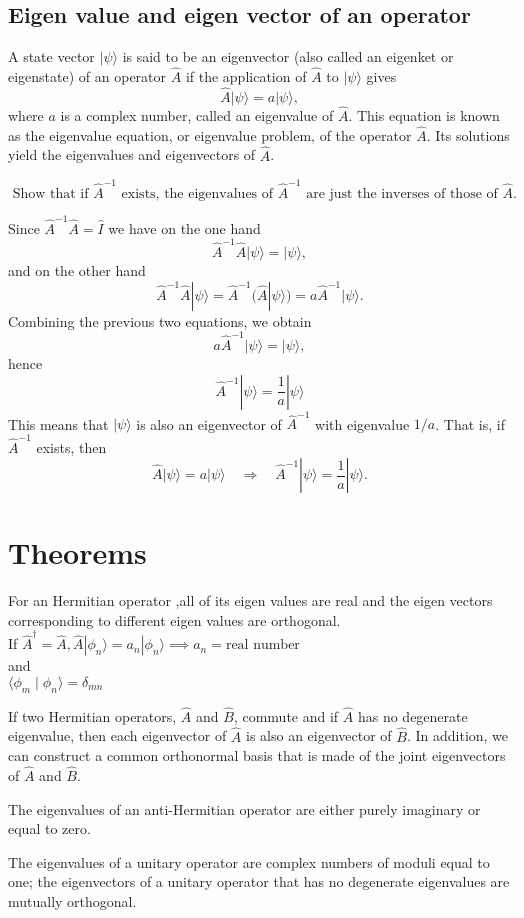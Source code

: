 \subsection{Eigen value and eigen vector of an operator}
A state vector $|\psi\rangle$ is said to be an eigenvector (also called an eigenket or eigenstate) of an operator $\hat{A}$ if the application of $\hat{A}$ to $|\psi\rangle$ gives
$$
\hat{A}|\psi\rangle=a|\psi\rangle,
$$
where $a$ is a complex number, called an eigenvalue of $\hat{A}$. This equation is known as the eigenvalue equation, or eigenvalue problem, of the operator $\hat{A}$. Its solutions yield the eigenvalues and eigenvectors of $\hat{A}$.
\begin{exercise}
	$\text { Show that if } \hat{A}^{-1} \text { exists, the eigenvalues of } \hat{A}^{-1} \text { are just the inverses of those of } \hat{A} \text {. }$
\end{exercise}
\begin{answer}
Since $\hat{A}^{-1} \hat{A}=\hat{I}$ we have on the one hand
$$
\hat{A}^{-1} \hat{A}|\psi\rangle=|\psi\rangle,
$$
and on the other hand
$$
\hat{A}^{-1} \hat{A}|\psi\rangle=\hat{A}^{-1}(\hat{A}|\psi\rangle)=a \hat{A}^{-1}|\psi\rangle .
$$
Combining the previous two equations, we obtain
$$
a \hat{A}^{-1}|\psi\rangle=|\psi\rangle,
$$	
hence
$$
\hat{A}^{-1}|\psi\rangle=\frac{1}{a}|\psi\rangle
$$
This means that $|\psi\rangle$ is also an eigenvector of $\hat{A}^{-1}$ with eigenvalue $1 / a$. That is, if $\hat{A}^{-1}$ exists, then
$$
\hat{A}|\psi\rangle=a|\psi\rangle \quad \Longrightarrow \quad \hat{A}^{-1}|\psi\rangle=\frac{1}{a}|\psi\rangle .
$$
\end{answer}
\section{Theorems} 
\begin{theorem}
For an Hermitian operator ,all of its eigen values are real and the eigen vectors corresponding to different eigen values are orthogonal.	\\
If $\hat{A}^{\dagger}=\hat{A}, \hat{A}|\phi_{n}\rangle =a_n |\phi_{n}\rangle \implies a_n=\text{real number }$\\
and\\
$\langle \phi_{m}\mid \phi_{n}\rangle=\delta_{mn}$
\end{theorem}
\begin{theorem}
If two Hermitian operators, $\hat{A}$ and $\hat{B}$, commute and if $\hat{A}$ has no degenerate eigenvalue, then each eigenvector of $\hat{A}$ is also an eigenvector of $\hat{B}$. In addition, we can construct a common orthonormal basis that is made of the joint eigenvectors of $\hat{A}$ and $\hat{B}$.
\end{theorem}
\begin{theorem}
 The eigenvalues of an anti-Hermitian operator are either purely imaginary or equal to zero.
\end{theorem}
\begin{theorem}
	 The eigenvalues of a unitary operator are complex numbers of moduli equal to one; the eigenvectors of a unitary operator that has no degenerate eigenvalues are mutually orthogonal.
\end{theorem}
